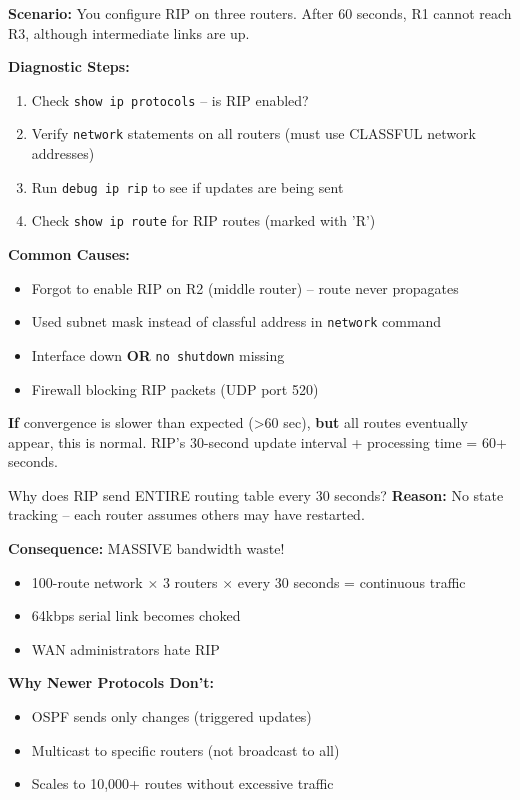 \documentclass[12pt,a4paper]{article}
\begin{document}

\begin{condbox}
\textbf{Scenario:} You configure RIP on three routers. After 60 seconds, R1 cannot reach R3, although intermediate links are up.

\textbf{Diagnostic Steps:}
\begin{enumerate}
    \item Check \texttt{show ip protocols} -- is RIP enabled?
    \item Verify \texttt{network} statements on all routers (must use CLASSFUL network addresses)
    \item Run \texttt{debug ip rip} to see if updates are being sent
    \item Check \texttt{show ip route} for RIP routes (marked with 'R')
\end{enumerate}

\textbf{Common Causes:}
\begin{itemize}
    \item Forgot to enable RIP on R2 (middle router) -- route never propagates
    \item Used subnet mask instead of classful address in \texttt{network} command
    \item Interface down \textbf{OR} \texttt{no shutdown} missing
    \item Firewall blocking RIP packets (UDP port 520)
\end{itemize}

\textbf{If} convergence is slower than expected (>60 sec), \textbf{but} all routes eventually appear, this is normal. RIP's 30-second update interval + processing time = 60+ seconds.
\end{condbox}


\begin{whenwhybox}{Why does RIP send ENTIRE routing table every 30 seconds?}
\textbf{Reason:} No state tracking -- each router assumes others may have restarted.

\textbf{Consequence:} MASSIVE bandwidth waste!
\begin{itemize}
    \item 100-route network $\times$ 3 routers $\times$ every 30 seconds = continuous traffic
    \item 64kbps serial link becomes choked
    \item WAN administrators hate RIP
\end{itemize}

\textbf{Why Newer Protocols Don't:}
\begin{itemize}
    \item OSPF sends only changes (triggered updates)
    \item Multicast to specific routers (not broadcast to all)
    \item Scales to 10,000+ routes without excessive traffic
\end{itemize}
\end{whenwhybox}
\end{document}
